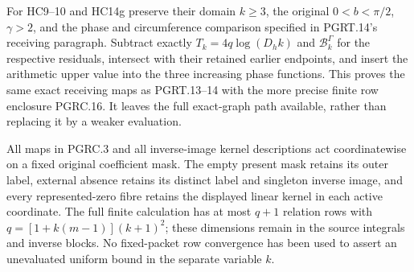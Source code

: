 For HC9--10 and HC14g preserve their domain $k\geq3$, the original
$0<b<\pi/2$, $\gamma>2$, and the phase and circumference comparison
specified in PGRT.14's receiving paragraph. Subtract exactly
$T_k=4q\log(D_hk)$ and $\mathcal B_k^\Gamma$ for the respective
residuals, intersect with their retained earlier endpoints, and
insert the arithmetic upper value into the three increasing
phase functions. This proves the same exact receiving maps as
PGRT.13--14 with the more precise finite row enclosure PGRC.16.
It leaves the full exact-graph path available, rather than
replacing it by a weaker evaluation.

All maps in PGRC.3 and all inverse-image kernel descriptions act
coordinatewise on a fixed original coefficient mask. The empty
present mask retains its outer label, external absence retains
its distinct label and singleton inverse image, and every
represented-zero fibre retains the displayed linear kernel in
each active coordinate. The full finite calculation has at
most $q+1$ relation rows with $q=[1+k(m-1)](k+1)^2$; these
dimensions remain in the source integrals and inverse blocks.
No fixed-packet row convergence has been used to assert an
unevaluated uniform bound in the separate variable $k$.
